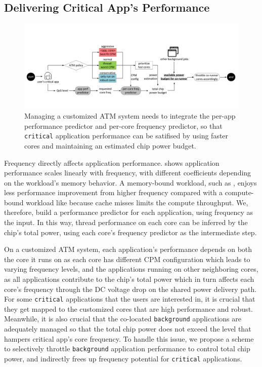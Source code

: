 \subsection{Delivering Critical App's Performance}
\label{sec:process:schedule:framework}

\begin{figure}[t]
  \centering
  \includegraphics[trim=10 90 10 150,clip,width=\linewidth]{graphs/process//schedule-flow/schedule-flow.pdf}
  \caption{Managing a customized ATM system needs to integrate the per-app performance predictor and per-core frequency predictor, so that \texttt{critical} application performance can be satifised by using faster cores and maintaining an estimated chip power budget.}
  \label{fig:schedule-flow}
  \vspace*{-0.4cm}
\end{figure}

Frequency directly affects application performance.  shows application performance scales linearly with frequency, with different coefficients depending on the workload's memory behavior. A memory-bound workload, such as , enjoys less performance improvement from higher frequency compared with a compute-bound workload like  because cache misses limits the compute throughput. We, therefore, build a performance predictor for each application, using frequency as the input. In this way, thread performance on each core can be inferred by the chip's total power, using each core's frequency predictor as the intermediate step.

On a customized ATM system, each application's performance depends on both the core it runs on as each core has different CPM configuration which leads to varying frequency levels, and the applications running on other neighboring cores, as all applications contribute to the chip's total power which in turn affects each core's frequency through the DC voltage drop on the shared power delivery path. For some \texttt{critical} applications that the users are interested in, it is crucial that they get mapped to the customized cores that are high performance and robust. Meanwhile, it is also crucial that the co-located \texttt{background} applications are adequately managed so that the total chip power does not exceed the level that hampers critical app's core frequency. To handle this issue, we propose a scheme to selectively throttle \texttt{background} application performance to control total chip power, and indirectly frees up frequency potential for \texttt{critical} applications.

